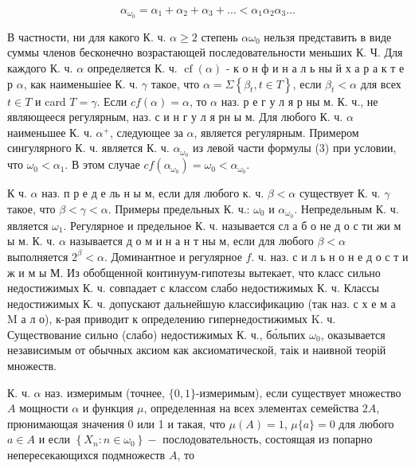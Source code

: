 \documentclass[10pt]{article}
\begin{document}
\[

\alpha_{\omega_{0}}=\alpha_{1}+\alpha_{2}+\alpha_{3}+\ldots<\alpha_{1} \alpha_{2} \alpha_{3} \ldots

\]



В частности, ни для какого К. ч. $\alpha \geqslant 2$ степень $\alpha \omega_{0}$ нельзя представить в виде суммы членов бесконечно возрастающей последовательности меньших К. Ч. Для каждого К. ч. $\alpha$ определяется К. ч. $\operatorname{cf}(\alpha)$ - к о н $ф$ и н а л ь ны й х а р а к т е р $\alpha$, как наименьшіее К. ч. $\gamma$ такое, что $\alpha=\Sigma\left\{\beta_{t}, t \in T\right\}$, если $\beta_{t}<\alpha$ для всех $t \in T$ и card $T=\gamma$. Если $c f(\alpha)=\alpha$, то $\alpha$ наз. р е г у л я р ны м. К. ч., не являющееся регулярным, наз. с и н г у л я рн ы м. Для любого К. ч. $\alpha$ наименьшее К. ч. $\alpha^{+}$, следующее за $\alpha$, является регулярным. Примером сингулярного К. ч. является К. ч. $\alpha_{\omega_{0}}$ из левой части формулы (3) при условии, что $\omega_{0}<\alpha_{1}$. В этом случае $c f\left(\alpha_{\omega_{0}}\right)=\omega_{0}<\alpha_{\omega_{0}}$.



К ч. $\alpha$ наз. п р е д е ль н ы м, если для любого к. ч. $\beta<\alpha$ существует К. ч. $\gamma$ такое, что $\beta<\gamma<\alpha$. Примеры предельных К. ч.: $\omega_{0}$ и $\alpha_{\omega_{0}}$. Непредельным К. ч. является $\omega_{1}$. Регулярное и предельное К. ч. называется сл а б о не д о с ти жи м ы м. К. ч. $\alpha$ называется д о м и н а н т ны м, если для любого $\beta<\alpha$ выполняется $2^{\beta}<\alpha$. Доминантное и регулярное $f$. ч. наз. с и л ь н о н е д о с т и ж и м ы М. Из обобщенной континуум-гипотезы вытекает, что класс сильно недостижимых $К$. ч. совпадает с классом слабо недостижимых К. ч. Классы недостижимых К. ч. допускают дальнейшую классификацию (так наз. с х е м а M а л о), к-рая приводит к определению гипернедостижимых K. ч. Существование сильно (слабо) недостижимых К. ч., бо́льпих $\omega_{0}$, оказывается независимым от обычных аксиом как аксиоматической, таік и наивной теорій множеств.



К. ч. $\alpha$ наз. измеримым (точнее, $\{0,1\}$-измеримым), если существует множество $A$ мощности $\alpha$ и функция $\mu$, определенная на всех элементах семейства $2 A$, прюнимающая значения 0 или 1 и такая, что $\mu(A)=1$, $\mu\{a\}=0$ для любого $a \in A$ и если $\left\{X_{n}: n \in \omega_{0}\right\}-$ послодовательность, состоящая из попарно непересекающихся подмножеств $A$, то
\end{document}
